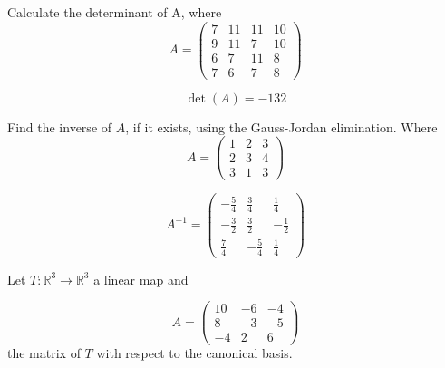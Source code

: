 \begin{questions}

\question Calculate the determinant of A, where
$$
A=\left(\begin{array}{rrrr}
7 & 11 & 11 & 10 \\
9 & 11 & 7 & 10 \\
6 & 7 & 11 & 8 \\
7 & 6 & 7 & 8
\end{array}\right)
$$

\begin{solution}
$$\det(A)=-132$$
\end{solution}

\question Find the inverse of $A$, if it exists, using the Gauss-Jordan elimination. Where
$$
A=\left(\begin{array}{rrr}
1 & 2 & 3 \\
2 & 3 & 4 \\
3 & 1 & 3
\end{array}\right)
$$

\begin{solution}
$$A^{-1}=\left(\begin{array}{rrr}
-\frac{5}{4} & \frac{3}{4} & \frac{1}{4} \\
-\frac{3}{2} & \frac{3}{2} & -\frac{1}{2} \\
\frac{7}{4} & -\frac{5}{4} & \frac{1}{4}
\end{array}\right)$$
\end{solution}

\question Let $T:\mathbb{R}^3\rightarrow\mathbb{R}^3$  a linear map and
 
$$
A=\left(\begin{array}{rrr}
10 & -6 & -4 \\
8 & -3 & -5 \\
-4 & 2 & 6
\end{array}\right)
$$
the matrix of $T$ with respect to the canonical basis.
\end{questions}
